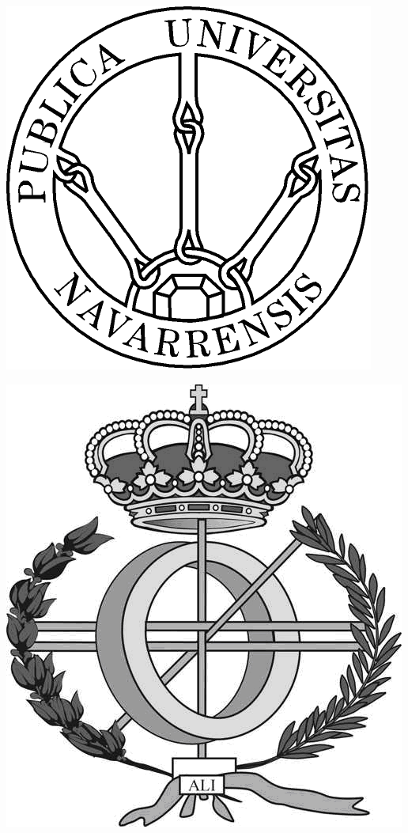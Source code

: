 \begin{titlepage}
\begin{center}

\begin{minipage}[t]{0.15\textwidth}
\includegraphics[width=\linewidth]{./images/logo_upna}
\end{minipage}
\hfill
\begin{minipage}[t]{0.15\textwidth}
\includegraphics[width=\linewidth]{./images/logo_escuela}
\end{minipage}\\[2cm]


\end{center}
\end{titlepage}
